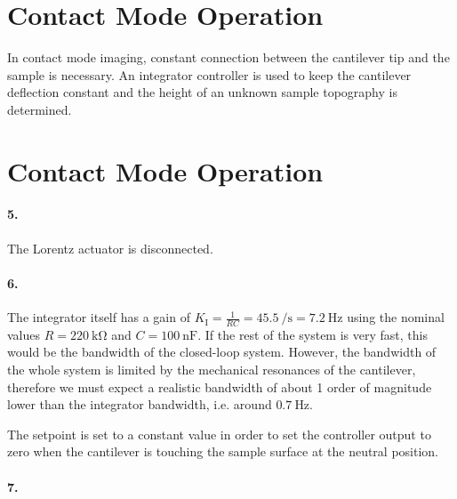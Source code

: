 \documentclass[a4paper,twoside,11pt,DIV=13,BCOR=5mm,numbers=noenddot]{scrbook}
\begin{document}

\section{Contact Mode Operation}
In contact mode imaging, constant connection between the cantilever tip and the sample is necessary.
An integrator controller is used to keep the cantilever deflection constant and the height of an unknown sample topography is determined.

\FloatBarrier
\section{Contact Mode Operation}
\paragraph*{5.}

The Lorentz actuator is disconnected.

\paragraph*{6.}


The integrator itself has a gain of $K_\mathrm{I} = \frac{1}{RC} = \qty{45.5}{\per\s} = \qty{7.2}{\Hz}$ using the nominal values $R=\qty{220}{\kilo\ohm}$ and $C=\qty{100}{\nano\F}$.
If the rest of the system is very fast, this would be the bandwidth of the closed-loop system. However, the bandwidth of the whole system is limited by the mechanical resonances of the cantilever,
therefore we must expect a realistic bandwidth of about 1 order of magnitude lower than the integrator bandwidth, i.e. around $\qty{0.7}{\Hz}$.

The setpoint is set to a constant value in order to set the controller output to zero when the cantilever is touching the sample surface at the neutral position.

\paragraph*{7.}
\end{document}
